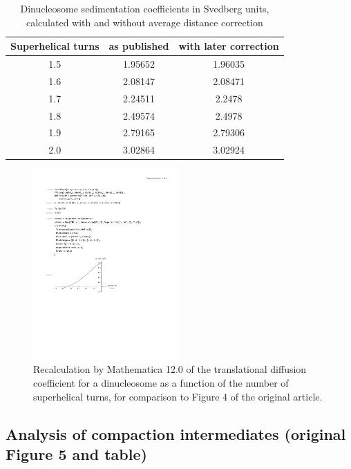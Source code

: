 \begin{table}[H]
\caption{Dinucleosome sedimentation coefficients in Svedberg units, calculated with and without average distance correction}
\begin{center}
\small
\begin{tabular}{c|c|c}
Superhelical turns & as published & with later correction \\
\hline
1.5	& 1.95652 & 1.96035 \\
1.6	& 2.08147 & 2.08471 \\
1.7	& 2.24511 & 2.2478 \\
1.8	& 2.49574 & 2.4978 \\
1.9	& 2.79165 & 2.79306 \\
2.0	& 3.02864 & 3.02924 \\
\end{tabular}
\normalsize
\end{center}
\label{table}
\end{table}
\begin{figure}[H]
\centering
\includegraphics[width=0.5\textwidth]{figs/figure4M12.pdf}
\caption{Recalculation by Mathematica 12.0 of the translational diffusion coefficient for a dinucleosome as a function of the number of superhelical turns, for comparison to Figure 4 of the original article.}
\label{figure4}
\end{figure}

\subsection{Analysis of compaction intermediates (original Figure 5 and table)}

